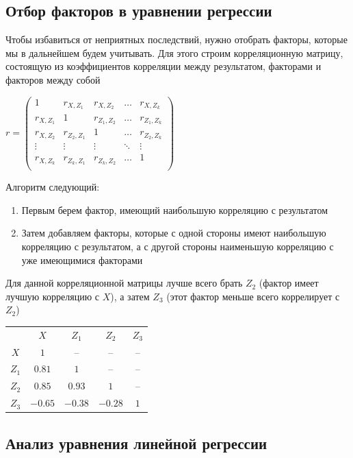 \subsection{Отбор факторов в уравнении регрессии}

Чтобы избавиться от неприятных последствий, нужно отобрать факторы, которые мы в дальнейшем будем учитывать. Для этого строим корреляционную матрицу, состоящую из коэффициентов корреляции между результатом, факторами и факторов между собой 

\smallvspace

$r = \begin{pmatrix}
    1 & r_{X, Z_1} & r_{X, Z_2} & \dots & r_{X, Z_k} \\ 
    r_{X, Z_1} & 1 & r_{Z_1, Z_2} & \dots & r_{Z_1, Z_k} \\ 
    r_{X, Z_2} & r_{Z_2, Z_1} & 1 & \dots & r_{Z_2, Z_k} \\ 
    \vdots & \vdots & \vdots & \ddots & \vdots \\ 
    r_{X, Z_k} & r_{Z_k, Z_1} & r_{Z_k, Z_2} & \dots & 1 \\ 
\end{pmatrix}$

\smallvspace

Алгоритм следующий: 

\begin{enumerate}
    \item Первым берем фактор, имеющий наибольшую корреляцию с результатом
    \item Затем добавляем факторы, которые с одной стороны имеют наибольшую корреляцию с результатом, а с другой стороны наименьшую корреляцию с уже имеющимися факторами
\end{enumerate}

\Ex Для данной корреляционной матрицы лучше всего брать $Z_2$ (фактор имеет лучшую корреляцию с $X$), 
а затем $Z_3$ (этот фактор меньше всего коррелирует с $Z_2$)

\begin{tabular}{c|c|c|c|c}
    & $X$ & $Z_1$ & $Z_2$ & $Z_3$ \\
    $X$ & $1$ & -- & -- & -- \\
    $Z_1$ & $0.81$ & $1$ & -- & -- \\
    $Z_2$ & $0.85$ & $0.93$ & $1$ & -- \\
    $Z_3$ & $-0.65$ & $-0.38$ & $-0.28$ & $1$
\end{tabular}

\subsection{Анализ уравнения линейной регрессии}

